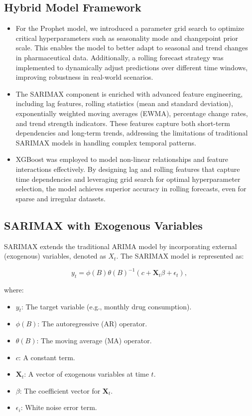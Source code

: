 \documentclass[journal]{IEEEtran}
\begin{document}
\subsection{Hybrid Model Framework}

\begin{itemize}
    \item For the Prophet model, we introduced a parameter grid search to optimize critical hyperparameters such as seasonality mode and changepoint prior scale. This enables the model to better adapt to seasonal and trend changes in pharmaceutical data. Additionally, a rolling forecast strategy was implemented to dynamically adjust predictions over different time windows, improving robustness in real-world scenarios.
    \item The SARIMAX component is enriched with advanced feature engineering, including lag features, rolling statistics (mean and standard deviation), exponentially weighted moving averages (EWMA), percentage change rates, and trend strength indicators. These features capture both short-term dependencies and long-term trends, addressing the limitations of traditional SARIMAX models in handling complex temporal patterns.
    \item XGBoost was employed to model non-linear relationships and feature interactions effectively. By designing lag and rolling features that capture time dependencies and leveraging grid search for optimal hyperparameter selection, the model achieves superior accuracy in rolling forecasts, even for sparse and irregular datasets.
\end{itemize}


\subsection{SARIMAX with Exogenous Variables}
SARIMAX extends the traditional ARIMA model by incorporating external (exogenous) variables, denoted as \(X_{t}\). The SARIMAX model is represented as:

\begin{equation}
y_{t}=\phi(B)\theta(B)^{-1}\left(c+\mathbf{X}_{t}\beta+\epsilon_{t}\right),
\end{equation}

where:
\begin{itemize}
    \item \(y_{t}\): The target variable (e.g., monthly drug consumption).
    \item \(\phi(B)\): The autoregressive (AR) operator.
    \item \(\theta(B)\): The moving average (MA) operator.
    \item \(c\): A constant term.
    \item \(\mathbf{X}_{t}\): A vector of exogenous variables at time \(t\).
    \item \(\beta\): The coefficient vector for \(\mathbf{X}_{t}\).
    \item \(\epsilon_{i}\): White noise error term.
\end{itemize}
\end{document}
